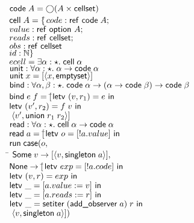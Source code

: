 \documentclass[preprint,natbib]{sigplanconf}
\begin{document}
\begin{figure}
\begin{tabbing}
$\mbox{\textsf{{code}}}\;{A} = \bigcirc{(A \times \mbox{\textsf{{cellset}}})}$ \\[1em]
$\mbox{\textsf{{cell}}}\;{A} = \{$\=$code: \mbox{\textsf{{ref }}}\mbox{\textsf{{code}}}\;{A};$ \\
                   \>$value: \mbox{\textsf{{ref }}}\mbox{\textsf{{option }}}{A};$ \\
                   \>$reads: \mbox{\textsf{{ref }}}\mbox{\textsf{{cellset}}};$ \\
                   \>$obs:   \mbox{\textsf{{ref }}}\mbox{\textsf{{cellset}}}\;$ \\
                   \>$id:    \mathbb{N}\}$ \\[1em]

$ecell = \exists \alpha:\star.\; \mbox{\textsf{{cell}}}\;{\alpha}$ \\[1em]

$\mbox{\textsf{{unit}}} : \forall \alpha:\star.\; \alpha \to \mbox{\textsf{{code}}}\;{\alpha}$ \\
$\mbox{\textsf{{unit}}}\;x = [\left<{x},{\mbox{\textsf{{emptyset}}}}\right>]$ \\[1em]

$\mbox{\textsf{{bind}}} : \forall \alpha,\beta:\star.\; \mbox{\textsf{{code}}}\;{\alpha} \to (\alpha \to \mbox{\textsf{{code}}}\;{\beta}) \to \mbox{\textsf{{code}}}\;{\beta}$ \\
$\mbox{\textsf{{bind}}}\;e\;f = [$\=$\mbox{\textsf{{letv }}}(v,r_1) = e\mbox{\textsf{{ in }}}$ \\
                        \>$\mbox{\textsf{{letv }}}(v',r_2) = f\;v\mbox{\textsf{{ in }}}$ \\
                        \>$\;\left<{v'},{\mbox{\textsf{{union}}}\;r_1\;r_2}\right>]$\\[1em]

$\mbox{\textsf{{read}}} : \forall \alpha:\star.\; \mbox{\textsf{{cell}}}\;{\alpha} \to \mbox{\textsf{{code}}}\;{\alpha}$ \\
$\mbox{\textsf{{read}}}\;a = [$\=$\mbox{\textsf{{letv }}}o = [!a.value]\mbox{\textsf{{ in }}}$ \\
                     \>$\mbox{\textsf{{run}}}\;\mbox{\textsf{{case}}}(o,$ \\
                     \>\qquad\= $\mbox{\textsf{{Some}}}\;v \to [\left<{v},{\mbox{\textsf{{singleton}}}\;a}\right>],$ \\
                     \>      \> $\mbox{\textsf{{None}}} \to [$\=$\mbox{\textsf{{letv }}}exp = [!a.code]\mbox{\textsf{{ in }}}$ \\
                     \>      \>                     \>$\mbox{\textsf{{letv }}}(v,r) = exp\mbox{\textsf{{ in }}}$ \\
                     \>      \>                     \>$\mbox{\textsf{{letv }}}\_ = [a.value := v]\mbox{\textsf{{ in }}}$\\
                     \>      \>                     \>$\mbox{\textsf{{letv }}}\_ = [a.reads := r]\mbox{\textsf{{ in }}}$ \\
                     \>      \>                     \>$\mbox{\textsf{{letv }}}\_ = \mbox{\textsf{{setiter}}}\;(\mbox{\textsf{{add\_observer}}}\;a)\;r\mbox{\textsf{{ in }}}$ \\
                     \>      \>                     \>$\;\left<{v},{\mbox{\textsf{{singleton}}}\;a}\right>])$ \\[1em]


\end{tabbing}
\end{figure}
\end{document}
